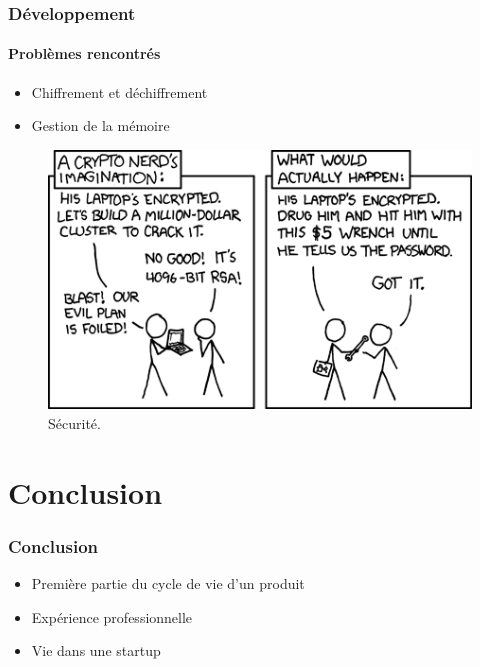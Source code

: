 \documentclass{beamer}
\begin{document}
\begin{frame}
 \frametitle{Développement}
 \framesubtitle{Problèmes rencontrés}
 \begin{minipage}{0.49\textwidth}
  \begin{itemize}
    \item Chiffrement et déchiffrement
    \item Gestion de la mémoire
  \end{itemize}
 \end{minipage}
 \begin{minipage}{0.49\textwidth}
   \begin{figure}[h!]
     \centering
     \includegraphics[scale=0.31]{presentation/xkcd_security.png}
     \caption{Sécurité\footnotemark.}
   \end{figure}
 \end{minipage}
\end{frame}

\section{Conclusion}
\begin{frame}
 \frametitle{Conclusion}
 \begin{itemize}
  \item Première partie du cycle de vie d'un produit
  \item Expérience professionnelle 
  \item Vie dans une startup
 \end{itemize}
\end{frame}
\end{document}
